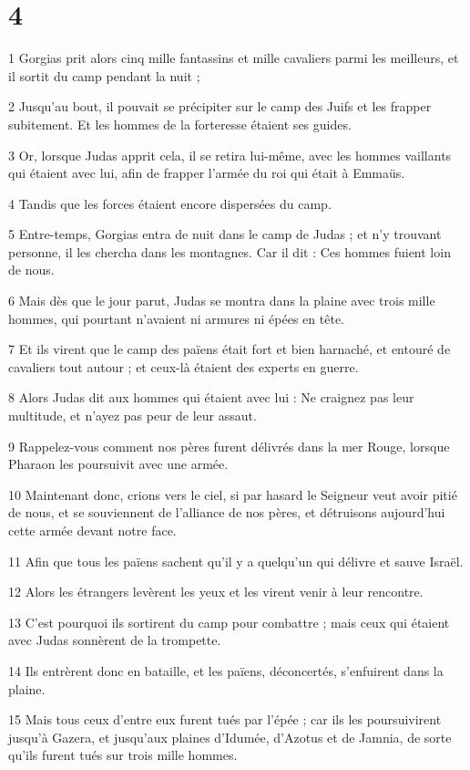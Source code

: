 \chapter{4}

\par 1 Gorgias prit alors cinq mille fantassins et mille cavaliers parmi les meilleurs, et il sortit du camp pendant la nuit ;
\par 2 Jusqu'au bout, il pouvait se précipiter sur le camp des Juifs et les frapper subitement. Et les hommes de la forteresse étaient ses guides.
\par 3 Or, lorsque Judas apprit cela, il se retira lui-même, avec les hommes vaillants qui étaient avec lui, afin de frapper l'armée du roi qui était à Emmaüs.
\par 4 Tandis que les forces étaient encore dispersées du camp.
\par 5 Entre-temps, Gorgias entra de nuit dans le camp de Judas ; et n'y trouvant personne, il les chercha dans les montagnes. Car il dit : Ces hommes fuient loin de nous.
\par 6 Mais dès que le jour parut, Judas se montra dans la plaine avec trois mille hommes, qui pourtant n'avaient ni armures ni épées en tête.
\par 7 Et ils virent que le camp des païens était fort et bien harnaché, et entouré de cavaliers tout autour ; et ceux-là étaient des experts en guerre.
\par 8 Alors Judas dit aux hommes qui étaient avec lui : Ne craignez pas leur multitude, et n'ayez pas peur de leur assaut.
\par 9 Rappelez-vous comment nos pères furent délivrés dans la mer Rouge, lorsque Pharaon les poursuivit avec une armée.
\par 10 Maintenant donc, crions vers le ciel, si par hasard le Seigneur veut avoir pitié de nous, et se souviennent de l'alliance de nos pères, et détruisons aujourd'hui cette armée devant notre face.
\par 11 Afin que tous les païens sachent qu'il y a quelqu'un qui délivre et sauve Israël.
\par 12 Alors les étrangers levèrent les yeux et les virent venir à leur rencontre.
\par 13 C'est pourquoi ils sortirent du camp pour combattre ; mais ceux qui étaient avec Judas sonnèrent de la trompette.
\par 14 Ils entrèrent donc en bataille, et les païens, déconcertés, s'enfuirent dans la plaine.
\par 15 Mais tous ceux d'entre eux furent tués par l'épée ; car ils les poursuivirent jusqu'à Gazera, et jusqu'aux plaines d'Idumée, d'Azotus et de Jamnia, de sorte qu'ils furent tués sur trois mille hommes.
